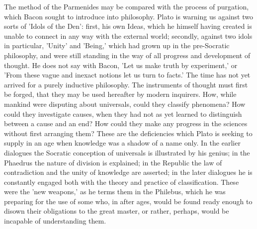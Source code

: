 The method of the Parmenides may be compared with the process of
purgation, which Bacon sought to introduce into philosophy. Plato is
warning us against two sorts of 'Idols of the Den': first, his own
Ideas, which he himself having created is unable to connect in any way
with the external world; secondly, against two idols in particular,
'Unity' and 'Being,' which had grown up in the pre-Socratic philosophy,
and were still standing in the way of all progress and development of
thought. He does not say with Bacon, 'Let us make truth by experiment,'
or 'From these vague and inexact notions let us turn to facts.' The time
has not yet arrived for a purely inductive philosophy. The instruments
of thought must first be forged, that they may be used hereafter by
modern inquirers. How, while mankind were disputing about universals,
could they classify phenomena? How could they investigate causes, when
they had not as yet learned to distinguish between a cause and an end?
How could they make any progress in the sciences without first arranging
them? These are the deficiencies which Plato is seeking to supply in an
age when knowledge was a shadow of a name only. In the earlier dialogues
the Socratic conception of universals is illustrated by his genius; in
the Phaedrus the nature of division is explained; in the Republic the
law of contradiction and the unity of knowledge are asserted; in the
later dialogues he is constantly engaged both with the theory and
practice of classification. These were the 'new weapons,' as he terms
them in the Philebus, which he was preparing for the use of some who, in
after ages, would be found ready enough to disown their obligations
to the great master, or rather, perhaps, would be incapable of
understanding them.

